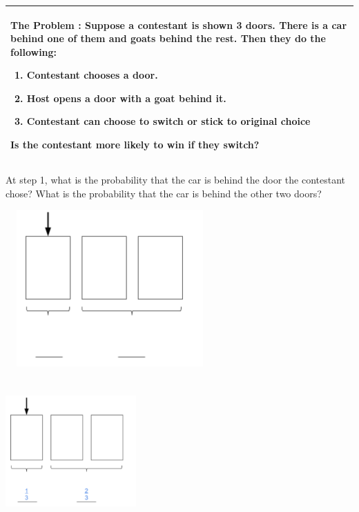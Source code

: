 {\tabulinesep=1mm
\begin{tabu}{|p{16cm} |}
\hline
\vspace{2 mm}
\textbf{The Problem} : \newline
Suppose a contestant is shown 3 doors. There is a car behind one of them 
and goats behind the rest. Then they do the following:
\begin{enumerate}
\item Contestant chooses a door.
\item Host opens a door with a goat behind it.
\item Contestant can choose to switch or stick to original choice
\end{enumerate}
Is the contestant more likely to win if they switch?
\vspace{2 mm}
\\
\hline
\end{tabu}
}
\newline

At step 1, what is the probability that the car is behind the door the 
contestant chose? What is the probability that the car is behind the 
other two doors?
\begin{center}
\includegraphics[width=8cm, height=6cm]{intro_doors_1.jpg}
\end{center}
\begin{solution}
\begin{center}
\includegraphics[width=5cm, height=5.5cm]{intro_doors_1_sol.jpg}
\end{center}
 \end{solution}
 
